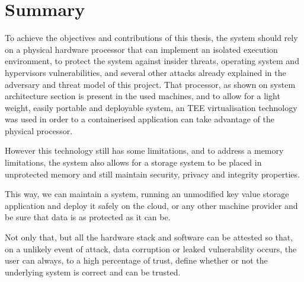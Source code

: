 \section{Summary} %
\label{sec:chapter3_summary}

To achieve the objectives and contributions of this thesis, the system should rely on a physical hardware processor that can implement an isolated execution environment, to protect the system against insider threats, operating system and hypervisors vulnerabilities, and several other attacks already explained in the adversary and threat model of this project. That processor, as shown on system architecture section is present in the used machines, and to allow for a light weight, easily portable and deployable system, an TEE virtualisation technology was used in order to a containerised application can take advantage of the physical processor.

However this technology still has some limitations, and to address a memory limitations, the system also allows for a storage system to be placed in unprotected memory and still maintain security, privacy and integrity properties.

This way, we can maintain a system, running an unmodified key value storage application and deploy it safely on the cloud, or any other machine provider and be sure that data is as protected as it can be.

Not only that, but all the hardware stack and software can be attested so that, on a unlikely event of attack, data corruption or leaked vulnerability occurs, the user can always, to a high percentage of trust, define whether or not the underlying system is correct and can be trusted.